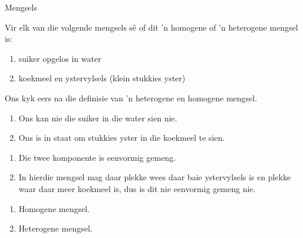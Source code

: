 \label{m38708*eip-479}
      \begin{wex}{Mengsels}
{
\begin{minipage}{\textwidth}
Vir elk van die volgende mengsels sê of dit 'n homogene of 'n heterogene mengsel is:
\label{m38708*eip-id1167649056231}\begin{enumerate}[noitemsep, label=\textbf{\alph*}. ] 
            \leftskip=20pt\rightskip=\leftskip\item suiker opgelos in water
\item koekmeel en ystervylsels (klein stukkies yster)
\end{enumerate} 
\end{minipage}
}
{
\begin{minipage}{\textwidth}
Ons kyk eers na die definisie van 'n heterogene en homogene mengsel.
\begin{enumerate}[noitemsep, label=\textbf{\alph*}. ] 
\item Ons kan nie die suiker in die water sien nie.
\item Ons is in staat om stukkies yster in die koekmeel te sien.
\end{enumerate}
\begin{enumerate}[noitemsep, label=\textbf{\alph*}. ] 
\item Die twee komponente is eenvormig gemeng.
\item In hierdie mengsel mag daar plekke wees daar baie ystervylsels is en plekke waar daar meer koekmeel is, dus is dit nie eenvormig gemeng nie.
\end{enumerate}
\begin{enumerate}[noitemsep, label=\textbf{\alph*}. ] 
\item Homogene mengsel.
\item Heterogene mengsel.
\end{enumerate}
\end{minipage}
}
    \end{wex}
 

